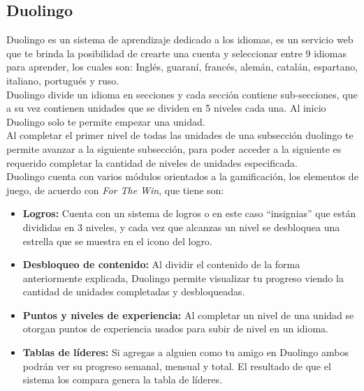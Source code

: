 \begin{multicols*}{2}    
\subsection*{Duolingo}
    
 Duolingo es un sistema de aprendizaje dedicado a los idiomas, es un servicio web que
 te brinda la posibilidad de crearte una cuenta y seleccionar entre 9 idiomas para aprender,
 los cuales son: Inglés, guaraní, francés, alemán, catalán, espartano, italiano, portugués y ruso.\\

 \noindent Duolingo divide un idioma en secciones y cada sección contiene sub-secciones,
 que a su vez contienen unidades que se dividen en 5 niveles cada una. Al inicio Duolingo
 solo te permite empezar una unidad.\\

 \noindent Al completar el primer nivel de todas las unidades de una subsección duolingo
 te permite avanzar a la siguiente subsección, para poder acceder a la siguiente es requerido
 completar la cantidad de niveles de unidades especificada.\\

 \noindent Duolingo cuenta con varios módulos orientados a la gamificación, los elementos
 de juego, de acuerdo con {\em For The Win}, que tiene son:

    \begin{itemize}
    \item {\bf Logros:} Cuenta con un sistema de logros o en este caso ``insignias''
        que están divididas en 3 niveles, y cada vez que alcanzas un nivel se 
        desbloquea una estrella que se muestra en el icono del logro.
            
    \item {\bf Desbloqueo de contenido:} Al dividir el contenido de la forma
        anteriormente explicada, Duolingo permite visualizar tu progreso viendo
        la cantidad de unidades completadas y desbloqueadas.
            
    \item {\bf Puntos y niveles de experiencia:} Al completar un nivel de una unidad
        se otorgan puntos de experiencia usados para subir de nivel en un idioma.
        
    \item {\bf Tablas de líderes:} Si agregas a alguien como tu amigo en Duolingo ambos 
        podrán ver su progreso semanal, mensual y total. El resultado de que el sistema
         los compara genera la tabla de líderes. 
         

\end{itemize}
\end{multicols*}
